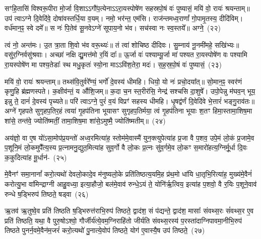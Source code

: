 सꣳहि॒तासि॑ विश्वरू॒पीरा मो॒र्जा वि॒शा\-ऽ\-ऽगौ॑प॒त्येना\-ऽ\-ऽरा॒यस्पोषे॑ण सहस्रपो॒षं वः॑ पुष्यासं॒ मयि॑ वो॒ रायः॑ श्रयन्ताम्॥ उप॑ त्वा\-ऽग्ने दि॒वेदि॑वे॒ दोषा॑वस्तर्धि॒या व॒यम्। नमो॒ भर॑न्त॒ एम॑सि। राज॑न्तमध्व॒राणां᳚ गो॒पामृ॒तस्य॒ दीदि॑विम्। वर्ध॑मान॒ꣴ॒ स्वे दमे᳚॥ स नः॑ पि॒तेव॑ सू॒नवे\-ऽग्ने॑ सूपाय॒नो भ॑व। सच॑स्वा नः स्व॒स्तये᳚॥ अग्ने॒~(२२)

त्वं नो॒ अन्त॑मः। उ॒त त्रा॒ता शि॒वो भ॑व वरू॒थ्यः॑॥ तं त्वा॑ शोचिष्ठ दीदिवः। सु॒म्नाय॑ नू॒नमी॑महे॒ सखि॑भ्यः॥ वसु॑र॒ग्निर्वसु॑श्रवाः। अच्छा॑ नक्षि द्यु॒मत्त॑मो र॒यिं दाः᳚॥ ऊ॒र्जा वः॑ पश्याम्यू॒र्जा मा॑ पश्यत रा॒यस्पोषे॑ण वः पश्यामि रा॒यस्पोषे॑ण मा पश्य॒तेडाः᳚ स्थ मधु॒कृतः॑ स्यो॒ना मा\-ऽ\-ऽवि॑श॒तेरा॒ मदः॑। स॒ह॒स्र॒पो॒षं वः॑ पुष्यासं॒~(२३)

मयि॑ वो॒ रायः॑ श्रयन्ताम्॥ तथ्स॑वि॒तुर्वरे᳚ण्यं॒ भर्गो॑ दे॒वस्य॑ धीमहि। धियो॒ यो नः॑ प्रचो॒दया᳚त्॥ सो॒मान॒ꣴ॒ स्वर॑णं कृणु॒हि ब्र॑ह्मणस्पते। क॒क्षीव॑न्तं॒ य औ॑शि॒जम्॥ क॒दा च॒न स्त॒रीर॑सि॒ नेन्द्र॑ सश्चसि दा॒शुषे᳚। उपो॒पेन्नु म॑घव॒न् भूय॒ इन्नु ते॒ दानं॑ दे॒वस्य॑ पृच्यते॥ परि॑ त्वाऽग्ने॒ पुरं॑ व॒यं विप्रꣳ॑ सहस्य धीमहि। धृ॒षद्व॑र्णं दि॒वेदि॑वे भे॒त्तारं॑ भङ्गु॒राव॑तः॥ अग्ने॑ गृहपते सुगृहप॒तिर॒हं त्वया॑ गृ॒हप॑तिना भूयासꣳ सुगृहप॒तिर्मया॒ त्वं गृ॒हप॑तिना भूयाः श॒तꣳ हिमा॒स्तामा॒शिष॒मा शा॑से॒ तन्त॑वे॒ ज्योति॑ष्मतीं॒ तामा॒शिष॒मा शा॑से॒\-ऽमुष्मै॒ ज्योति॑ष्मतीम्॥~(२४)

{\anuvakamend[{भू॒या॒स्त॒ स्व॒स्तये\-ऽग्ने॑ पुष्यासं धृ॒षद्व॑र्ण॒मेका॒न्न\-त्रि॒ꣳ॒शच्च॑}]}%

अय॑ज्ञो॒ वा ए॒ष यो॑\-ऽसा॒मोप॑प्र॒यन्तो॑ अध्व॒रमित्या॑ह॒ स्तोम॑मे॒वास्मै॑ युन॒क्त्युपेत्या॑ह प्र॒जा वै प॒शव॒ उपे॒मं लो॒कं प्र॒जामे॒व प॒शूनि॒मं लो॒कमुपै᳚त्य॒स्य प्र॒त्नामनु॒द्युत॒मित्या॑ह सुव॒र्गो वै लो॒कः प्र॒त्नः सु॑व॒र्गमे॒व लो॒कꣳ स॒मारो॑हत्य॒ग्निर्मू॒र्धा दि॒वः क॒कुदित्या॑ह मू॒र्धान॑-~(२५)

मे॒वैनꣳ॑ समा॒नानां᳚ करो॒त्यथो॑ देवलो॒कादे॒व म॑नुष्यलो॒के प्रति॑तिष्ठत्य॒यमि॒ह प्र॑थ॒मो धा॑यि धा॒तृभि॒रित्या॑ह॒ मुख्य॑मे॒वैनं॑ करोत्यु॒भा वा॑मिन्द्राग्नी आहु॒वध्या॒ इत्या॒हौजो॒ बल॑मे॒वाव॑ रुन्धे॒\-ऽयं ते॒ योनि॑र्\mbox{}ऋ॒त्विय॒ इत्या॑ह प॒शवो॒ वै र॒यिः प॒शूने॒वाव॑ रुन्धे ष॒ड्भिरुप॑ तिष्ठते॒ षड्वा~(२६)

ऋ॒तव॑ ऋ॒तुष्वे॒व प्रति॑ तिष्ठति ष॒ड्भिरुत्त॑राभि॒रुप॑ तिष्ठते॒ द्वाद॑श॒ सं प॑द्यन्ते॒ द्वाद॑श॒ मासाः᳚ संवथ्स॒रः सं॑वथ्स॒र ए॒व प्रति॑ तिष्ठति॒ यथा॒ वै पुरु॒षो\-ऽश्वो॒ गौर्जीर्य॑त्ये॒वम॒ग्निराहि॑तो जीर्यति संवथ्स॒रस्य॑ प॒रस्ता॑दाग्निपावमा॒नीभि॒रुप॑ तिष्ठते पुनर्न॒वमे॒वैन॑म॒जरं॑ करो॒त्यथो॑ पु॒नात्ये॒वोप॑ तिष्ठते॒ योग॑ ए॒वास्यै॒ष उप॑ तिष्ठते॒~(२७)

